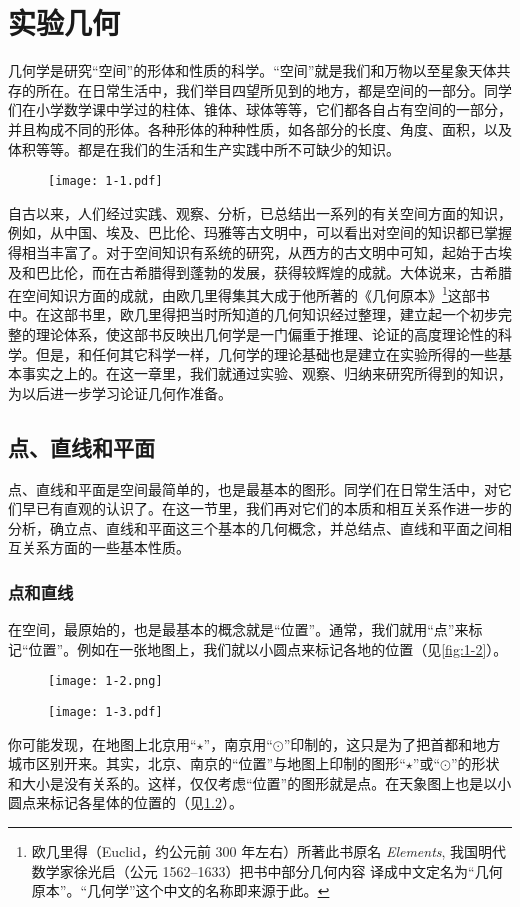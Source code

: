 \chapter{实验几何}\label{chp:experiment_geometry}
几何学是研究“空间”的形体和性质的科学。“空间”就是我们和万物以至星象天体共存的所在。在日常生活中，我们举目四望所见到的地方，都是空间的一部分。同学们在小学数学课中学过的柱体、锥体、球体等等，它们都各自占有空间的一部分，并且构成不同的形体。各种形体的种种性质，如各部分的长度、角度、面积，以及体积等等。都是在我们的生活和生产实践中所不可缺少的知识。
\begin{figure}
	\texttt{[image: 1-1.pdf]}
	\caption{}\label{fig:1-1}
\end{figure}

自古以来，人们经过实践、观察、分析，已总结出一系列的有关空间方面的知识，例如，从中国、埃及、巴比伦、玛雅等古文明中，可以看出对空间的知识都已掌握得相当丰富了。对于空间知识有系统的研究，从西方的古文明中可知，起始于古埃及和巴比伦，而在古希腊得到蓬勃的发展，获得较辉煌的成就。大体说来，古希腊在空间知识方面的成就，由欧几里得集其大成于他所著的《几何原本》\footnote{欧几里得（Euclid，约公元前 300 年左右）所著此书原名 \textit{Elements}, 我国明代数学家徐光启（公元 1562--1633）把书中部分几何内容	译成中文定名为“几何原本”。“几何学”这个中文的名称即来源于此。}这部书中。在这部书里，欧几里得把当时所知道的几何知识经过整理，建立起一个初步完整的理论体系，使这部书反映出几何学是一门偏重于推理、论证的高度理论性的科学。但是，和任何其它科学一样，几何学的理论基础也是建立在实验所得的一些基本事实之上的。在这一章里，我们就通过实验、观察、归纳来研究所得到的知识，为以后进一步学习论证几何作准备。

\section{点、直线和平面}
点、直线和平面是空间最简单的，也是最基本的图形。同学们在日常生活中，对它们早已有直观的认识了。在这一节里，我们再对它们的本质和相互关系作进一步的分析，确立点、直线和平面这三个基本的几何概念，并总结点、直线和平面之间相互关系方面的一些基本性质。

\subsection{点和直线}
在空间，最原始的，也是最基本的概念就是“位置”。通常，我们就用“点”来标记“位置”。例如在一张地图上，我们就以小圆点来标记各地的位置（见\cref{fig:1-2}）。
\begin{figure}
	\begin{minipage}[b]{0.48\linewidth}
		\centering
		\texttt{[image: 1-2.png]}
		\caption{}\label{fig:1-2}
	\end{minipage}
	\begin{minipage}[b]{0.48\linewidth}
		\centering
		\texttt{[image: 1-3.pdf]}
		\caption{}\label{fig:1-3}
	\end{minipage}
\end{figure}
你可能发现，在地图上北京用“$\star$”，南京用“{$\scriptstyle\odot$}”印制的，这只是为了把首都和地方城市区别开来。其实，北京、南京的“位置”与地图上印制的图形“$\star$”或“{$\scriptstyle\odot$}”的形状和大小是没有关系的。这样，仅仅考虑“位置”的图形就是点。在天象图上也是以小圆点来标记各星体的位置的（见\cref{fig:1-3}）。

